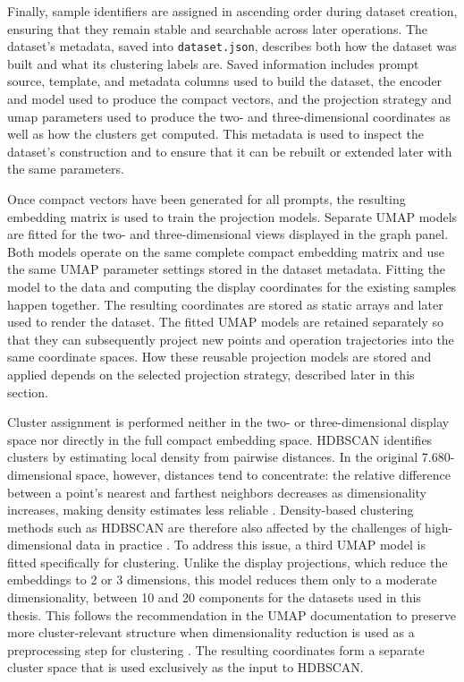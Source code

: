 Finally, sample identifiers are assigned in ascending order during dataset creation, ensuring that they remain stable and searchable across later operations.
The dataset's metadata, saved into \texttt{dataset.json}, describes both how the dataset was built and what its clustering labels are. Saved information includes prompt source, template, and metadata columns used to build the dataset, the encoder and model used to produce the compact vectors, and the projection strategy and umap parameters used to produce the two- and three-dimensional coordinates as well as how the clusters get computed. This metadata is used to inspect the dataset's construction and to ensure that it can be rebuilt or extended later with the same parameters.

Once compact vectors have been generated for all prompts, the resulting embedding matrix is used to train the projection models. Separate UMAP models are fitted for the two- and three-dimensional views displayed in the graph panel. Both models operate on the same complete compact embedding matrix and use the same UMAP parameter settings stored in the dataset metadata.
Fitting the model to the data and computing the display coordinates for the existing samples happen together. The resulting coordinates are stored as static arrays and later used to render the dataset. The fitted UMAP models are retained separately so that they can subsequently project new points and operation trajectories into the same coordinate spaces. How these reusable projection models are stored and applied depends on the selected projection strategy, described later in this section.

Cluster assignment is performed neither in the two- or three-dimensional display space nor directly in the full compact embedding space. HDBSCAN identifies clusters by estimating local density from pairwise distances. In the original 7.680-dimensional space, however, distances tend to concentrate: the relative difference between a point's nearest and farthest neighbors decreases as dimensionality increases, making density estimates less reliable \cite{aggarwal2001distancemetrics}. Density-based clustering methods such as HDBSCAN are therefore also affected by the challenges of high-dimensional data in practice \cite{mcinnes2026umapclustering}.
To address this issue, a third UMAP model is fitted specifically for clustering. Unlike the display projections, which reduce the embeddings to 2 or 3 dimensions, this model reduces them only to a moderate dimensionality, between 10 and 20 components for the datasets used in this thesis. This follows the recommendation in the UMAP documentation to preserve more cluster-relevant structure when dimensionality reduction is used as a preprocessing step for clustering \cite{mcinnes2026umapclustering}. The resulting coordinates form a separate cluster space that is used exclusively as the input to HDBSCAN.

